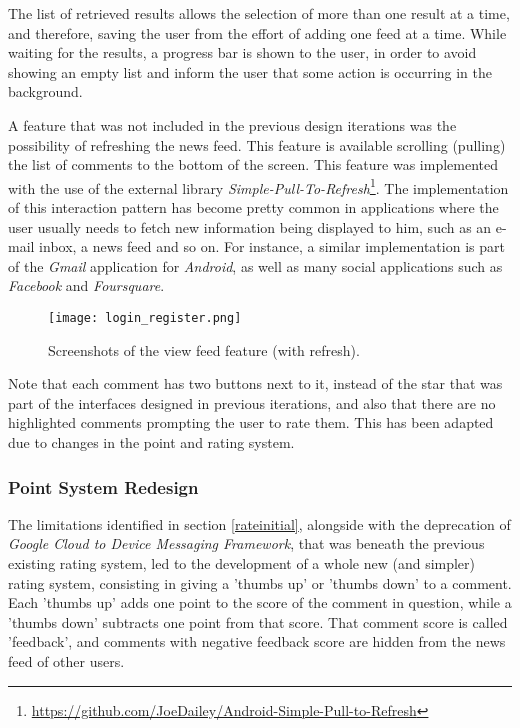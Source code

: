 The list of retrieved results allows the selection of more than one result at a time, and therefore, saving the user from the effort of adding one feed at a time.
While waiting for the results, a progress bar is shown to the user, in order to avoid showing an empty list and inform the user that some action is occurring in the background.

A feature that was not included in the previous design iterations was the possibility of refreshing the news feed. This feature is available scrolling (pulling) the list of comments to the bottom of the screen. This feature was implemented with the use of the external library \emph{Simple-Pull-To-Refresh}\footnote{\url{https://github.com/JoeDailey/Android-Simple-Pull-to-Refresh}}. The implementation of this interaction pattern has become pretty common in applications where the user usually needs to fetch new information being displayed to him, such as an e-mail inbox, a news feed and so on. For instance, a similar implementation is part of the \emph{Gmail} application for \emph{Android}, as well as many social applications such as \emph{Facebook} and \emph{Foursquare}. 

\begin{figure}[!h]
  \begin{center}
    \leavevmode
    \texttt{[image: login\_register.png]}
    \caption{Screenshots of the view feed feature (with refresh).}
    \label{fig:feed2}
  \end{center}
\end{figure}


Note that each comment has two buttons next to it, instead of the star that was part of the interfaces designed in previous iterations, and also that there are no highlighted comments prompting the user to rate them. This has been adapted due to changes in the point and rating system.

\subsubsection{Point System Redesign}\label{points}

The limitations identified in section \ref{rateinitial}, alongside with the deprecation of \emph{Google Cloud to Device Messaging Framework}, that was beneath the previous existing rating system, led to the development of a whole new (and simpler) rating system, consisting in giving a 'thumbs up' or 'thumbs down' to a comment. Each 'thumbs up' adds one point to the score of the comment in question, while a 'thumbs down' subtracts one point from that score. That comment score is called 'feedback', and comments with negative feedback score are hidden from the news feed of other users. 

